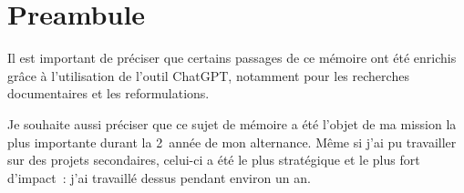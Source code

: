\section*{Preambule}

Il est important de préciser que certains passages de ce mémoire ont été enrichis grâce à l'utilisation de l'outil ChatGPT, notamment pour les recherches documentaires et les reformulations.

Je souhaite aussi préciser que ce sujet de mémoire a été l'objet de ma mission la plus importante durant la 2\ieme{}~année de mon alternance. Même si j'ai pu travailler sur des projets secondaires, celui-ci a été le plus stratégique et le plus fort d'impact~: j'ai travaillé dessus pendant environ un an.
\newpage